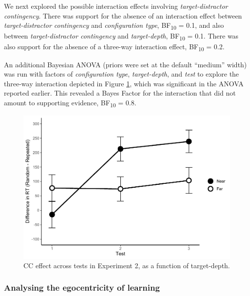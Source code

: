 \documentclass[
  english,
  man,floatsintext]{apa7}
\begin{document}
We next explored the possible interaction effects involving \emph{target-distractor contingency}. There was support for the absence of an interaction effect between \emph{target-distractor contingency} and \emph{configuration type}, BF\textsubscript{10} = 0.1, and also between \emph{target-distractor contingency} and \emph{target-depth}, BF\textsubscript{10} = 0.1. There was also support for the absence of a three-way interaction effect, BF\textsubscript{10} = 0.2.

An additional Bayesian ANOVA (priors were set at the default ``medium'' width) was run with factors of \emph{configuration type}, \emph{target-depth}, and \emph{test} to explore the three-way interaction depicted in Figure \ref{fig:Exp2-CC-figure}, which was significant in the ANOVA reported earlier. This revealed a Bayes Factor for the interaction that did not amount to supporting evidence, BF\textsubscript{10} = 0.8.



\begin{figure}

{\centering \includegraphics[width=1\linewidth]{CCVR_manuscript_files/figure-latex/Exp2-CC-figure-1} 

}

\caption{CC effect across tests in Experiment 2, as a function of target-depth.}\label{fig:Exp2-CC-figure}
\end{figure}

\hypertarget{analysing-the-egocentricity-of-learning}{%
\subsubsection{Analysing the egocentricity of learning}\label{analysing-the-egocentricity-of-learning}}
\end{document}
